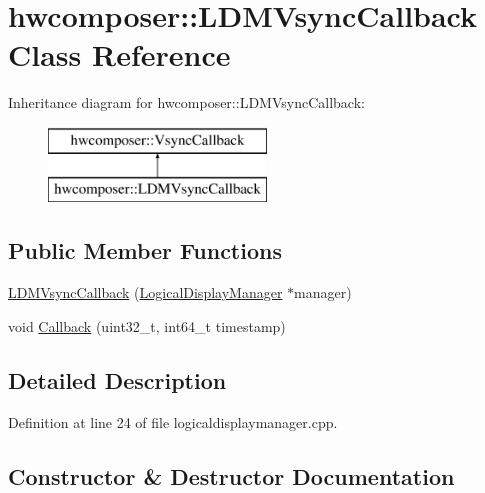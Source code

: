 \hypertarget{classhwcomposer_1_1LDMVsyncCallback}{}\section{hwcomposer\+:\+:L\+D\+M\+Vsync\+Callback Class Reference}
\label{classhwcomposer_1_1LDMVsyncCallback}
Inheritance diagram for hwcomposer\+:\+:L\+D\+M\+Vsync\+Callback\+:\begin{figure}[H]
\begin{center}
\leavevmode
\includegraphics[height=2.000000cm]{classhwcomposer_1_1LDMVsyncCallback}
\end{center}
\end{figure}
\subsection*{Public Member Functions}
\begin{DoxyCompactItemize}
\item 
\mbox{\hyperlink{classhwcomposer_1_1LDMVsyncCallback_ad7dc0df06c853a09bf6f3469d5abebc6}{L\+D\+M\+Vsync\+Callback}} (\mbox{\hyperlink{classhwcomposer_1_1LogicalDisplayManager}{Logical\+Display\+Manager}} $\ast$manager)
\item 
void \mbox{\hyperlink{classhwcomposer_1_1LDMVsyncCallback_ae92d66fdf645fa105ac163e33e5e6526}{Callback}} (uint32\+\_\+t, int64\+\_\+t timestamp)
\end{DoxyCompactItemize}


\subsection{Detailed Description}


Definition at line 24 of file logicaldisplaymanager.\+cpp.



\subsection{Constructor \& Destructor Documentation}
\mbox{\label{classhwcomposer_1_1LDMVsyncCallback_ad7dc0df06c853a09bf6f3469d5abebc6}} 
